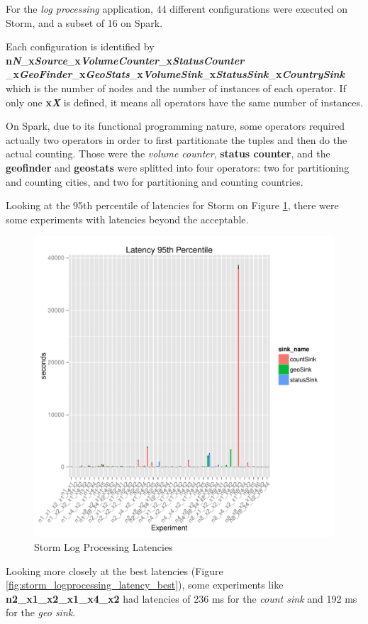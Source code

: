 \documentclass[ppgc,diss,english]{iiufrgs}
\begin{document}
For the \textit{log processing} application, 44 different configurations were executed on Storm, and a subset of 16 on Spark.

Each configuration is identified by \textbf{n\textit{N}}\_\textbf{x\textit{Source}}\_\textbf{x\textit{VolumeCounter}}\_\textbf{x\textit{StatusCounter}}\\\_\textbf{x\textit{GeoFinder}}\_\textbf{x\textit{GeoStats}}\_\textbf{x\textit{VolumeSink}}\_\textbf{x\textit{StatusSink}}\_\textbf{x\textit{CountrySink}} which is the number of nodes and the number of instances of each operator. If only one \textbf{x\textit{X}} is defined, it means all operators have the same number of instances.

On Spark, due to its functional programming nature, some operators required actually two operators in order to first partitionate the tuples and then do the actual counting. Those were the \textit{volume counter}, \textbf{status counter}, and the \textbf{geofinder} and \textbf{geostats} were splitted into four operators: two for partitioning and counting cities, and two for partitioning and counting countries.

Looking at the 95th percentile of latencies for Storm on Figure \ref{fig:storm_logprocessing_latency}, there were some experiments with latencies beyond the acceptable.

\begin{figure}[H]
    \centering
	\includegraphics[width=.6\textwidth]{summaries/storm_logprocessing/full_latency.pdf}
	\caption{Storm Log Processing Latencies}
	\label{fig:storm_logprocessing_latency}
\end{figure}

Looking more closely at the best latencies (Figure \ref{fig:storm_logprocessing_latency_best}), some experiments like \textbf{n2\_x1\_x2\_x1\_x4\_x2} had latencies of 236 ms for the \textit{count sink} and 192 ms for the \textit{geo sink}.
\end{document}
